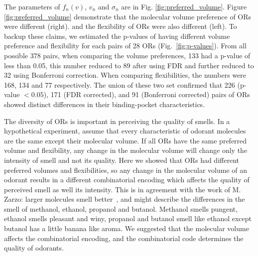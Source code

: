 \documentclass[fleqn,11pt]{wlscirep}
\newcommand{\numberofreceptors}{ 28 }
\begin{document}
The parameters of $f_n(v)$, $v_n$ and $\sigma_n$ are in Fig. \ref{fig:preferred_volume}.
Figure \ref{fig:preferred_volume} demonstrate that the molecular volume preference of ORs were different (right). 
and the flexibility of ORs were also different (left).
To backup these claims, 
we estimated the p-values of having different volume preference and flexibility for each pairs of \numberofreceptors ORs
(Fig.~\ref{fig:p-values}). 
From all possible 378 pairs, 
when comparing the volume preferences, 
133 had a p-value of less than 0.05, 
this number reduced to 89 after using FDR and further reduced to 32 using Bonferroni correction.
When comparing flexibilities, 
the numbers were 168, 134 and 77 respectively. 
The union of these two set confirmed that 226 (p-value $<0.05$), 171 (FDR corrected), and 91 (Bonferroni corrected) pairs of ORs showed distinct differences in their binding-pocket characteristics.

The diversity of ORs is important in perceiving the quality of smells. 
In a hypothetical experiment, 
assume that every characteristic of odorant molecules are the same except their molecular volume.
If all ORs  have the same preferred volume and flexibility, 
any change in the molecular volume will change only the intensity of smell and not its quality.
Here we showed that ORs  had different preferred volumes and flexibilities, 
so any change in the molecular volume of an odorant results in a different combinatorial encoding which affects the quality of perceived smell as well its intensity.
This is in agreement with the work of M. Zarzo: larger molecules  smell better~\cite{zarzo2011},
and might describe the differences in the smell of methanol, ethanol, propanol and butanol. 
Methanol smells pungent, ethanol smells pleasant and winy, propanol and butanol smell like ethanol except butanol has a little banana like aroma.
We suggested that the molecular volume affects the combinatorial encoding, 
and the combinatorial code determines the quality of odorants.
\end{document}
